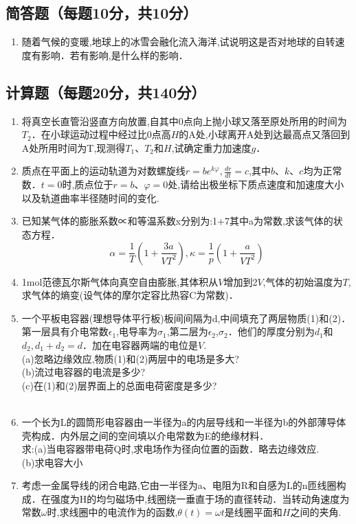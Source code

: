 
\subsection{简答题（每题10分，共10分）}
\begin{enumerate}
\item 随着气候的变暖,地球上的冰雪会融化流入海洋,试说明这是否对地球的自转速度有影响．若有影响,是什么样的影响．
\end{enumerate}
\subsection{计算题（每题20分，共140分）}
\begin{enumerate}
\item 将真空长直管沿竖直方向放置,自其中0点向上抛小球又落至原处所用的时间为$T_2$．在小球运动过程中经过比0点高$H$的$\mathrm A$处,小球离开$\mathrm A$处到达最高点又落回到$\mathrm A$处所用时间为T,现测得$T_1$、$T_2$和$H$,试确定重力加速度$g$．
\item 质点在平面上的运动轨道为对数螺旋线$r=be^{k\varphi},\frac{dr}{dt}=c$,其中$b$、$k$、$c$均为正常数．$t=0$时,质点位于$r=b$、$\varphi=0$处,请给出极坐标下质点速度和加速度大小以及轨道曲率半径随时间的变化.
\item 已知某气体的膨胀系数∝和等温系数x分别为:1+7其中a为常数,求该气体的状态方程．
\begin{equation}
\alpha=\frac{1}{T}(1+\frac{3a}{VT^2}),\kappa=\frac{1}{p}(1+\frac{a}{VT^2})
\end{equation}
\item 1mol范德瓦尔斯气体向真空自由膨胀,其体积从$V$增加到2$V$,气体的初始温度为$T$,求气体的熵变(设气体的摩尔定容比热容C为常数)．
\item 一个平板电容器(理想导体平行板)板间间隔为d,中间填充了两层物质(1)和(2)．第一层具有介电常数$\epsilon_1$,电导率为$\sigma_1$,第二层为$\epsilon_2$,$\sigma_2$．他们的厚度分别为$d_1$和$d_2,d_1+d_2=d$．加在电容器两端的电位是$V$.\\
(a)忽略边缘效应,物质(1)和(2)两层中的电场是多大?\\
(b)流过电容器的电流是多少?\\
(c)在(1)和(2)层界面上的总面电荷密度是多少?\\
\\
\item 一个长为L的圆筒形电容器由一半径为a的内层导线和一半径为b的外部薄导体壳构成．内外层之间的空间填以介电常数为E的绝缘材料．\\
求:(a)当电容器带电荷Q时,求电场作为径向位置的函数．略去边缘效应.\\
(b)求电容大小
\item 考虑一金属导线的闭合电路,它由一半径为a、电阻为R和自感为L的n匝线圈构成．在强度为H的均匀磁场中,线圈绕一垂直于场的直径转动．当转动角速度为常数$\omega$时,求线圈中的电流作为的函数,$\theta (t)=\omega t$是线圈平面和$H$之间的夹角.

\end{enumerate}